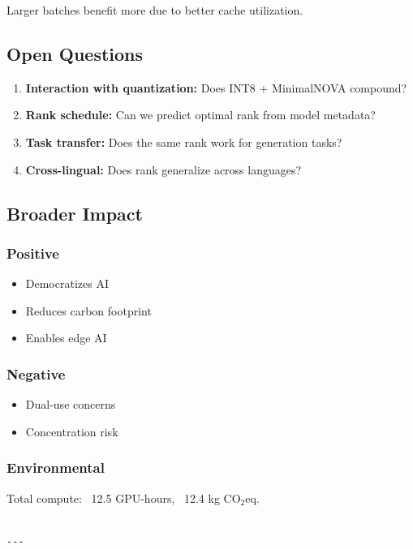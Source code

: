 Larger batches benefit more due to better cache utilization.

\subsection{Open Questions}

\begin{enumerate}
\item \textbf{Interaction with quantization:} Does INT8 + MinimalNOVA compound?
\item \textbf{Rank schedule:} Can we predict optimal rank from model metadata?
\item \textbf{Task transfer:} Does the same rank work for generation tasks?
\item \textbf{Cross-lingual:} Does rank generalize across languages?

\end{enumerate}
\subsection{Broader Impact}

\subsubsection{Positive}
\begin{itemize}
\item Democratizes AI
\item Reduces carbon footprint
\item Enables edge AI

\end{itemize}
\subsubsection{Negative}
\begin{itemize}
\item Dual-use concerns
\item Concentration risk

\end{itemize}
\subsubsection{Environmental}
Total compute: ~12.5 GPU-hours, ~12.4 kg CO$_2$eq.
\begin{lstlisting}

---
\end{lstlisting}